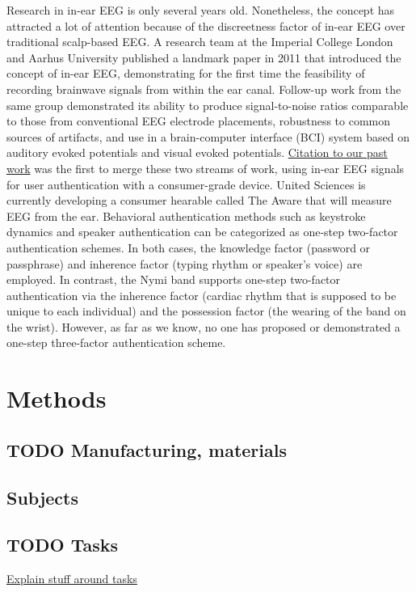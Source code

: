 \documentclass[letterpaper,twocolumn,10pt]{article}
\begin{document}
Research in in-ear EEG is only several years old. Nonetheless, the concept has
attracted a lot of attention because of the discreetness factor of in-ear EEG over
traditional scalp-based EEG. A research team at the Imperial College London
and Aarhus University published a landmark paper in 2011 that introduced the
concept of in-ear EEG, demonstrating for the first time the feasibility of recording
brainwave signals from within the ear canal. Follow-up work from the same
group demonstrated its ability to produce signal-to-noise ratios comparable to
those from conventional EEG electrode placements, robustness to common
sources of artifacts, and use in a brain-computer interface (BCI) system based on
auditory evoked potentials and visual evoked potentials.
\underline{Citation to our past work} 
was the first to merge these two streams of work, using in-ear EEG signals for
user authentication with a consumer-grade device. United Sciences is currently
developing a consumer hearable called The Aware that will measure EEG from the ear.
Behavioral authentication methods such as keystroke dynamics and speaker
authentication can be categorized as one-step two-factor authentication
schemes. In both cases, the knowledge factor (password or passphrase) and
inherence factor (typing rhythm or speaker’s voice) are employed. In contrast, the
Nymi band supports one-step two-factor authentication via the inherence
factor (cardiac rhythm that is supposed to be unique to each individual) and the
possession factor (the wearing of the band on the wrist). However, as far as we
know, no one has proposed or demonstrated a one-step three-factor
authentication scheme.
\section{Methods}
\label{sec:org63d105c}
\subsection{{\bfseries\sffamily TODO} Manufacturing, materials}
\label{sec:orgb483219}
\subsection{Subjects}
\label{sec:orgaf30da9}
\subsection{{\bfseries\sffamily TODO} Tasks}
\label{sec:org86eea32}

\underline{Explain stuff around tasks}
\end{document}
